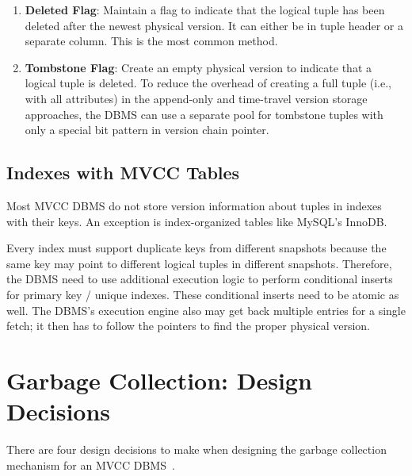 \documentclass[11pt]{article}
\begin{document}
\begin{enumerate}
    \item \textbf{Deleted Flag}:
    Maintain a flag to indicate that the logical tuple has been 
    deleted after the newest physical version. It can either be in tuple header or a separate 
    column. This is the most common method.

    \item \textbf{Tombstone Flag}:
    Create an empty physical version to indicate that a logical tuple is deleted. To reduce the 
    overhead of creating a full tuple (i.e., with all attributes) in the append-only and 
    time-travel version storage approaches, the DBMS can use a separate pool for tombstone tuples 
    with only a special bit pattern in version chain pointer.
\end{enumerate}

\subsection*{Indexes with MVCC Tables}
Most MVCC DBMS do not store version information about tuples in indexes with their keys. An 
exception is index-organized tables like MySQL's InnoDB.

Every index must support duplicate keys from different snapshots because the same key may point to 
different logical tuples in different snapshots. Therefore, the DBMS need to use additional 
execution logic to perform conditional inserts for primary key / unique indexes. These conditional 
inserts need to be atomic as well. The DBMS's execution engine also may get back multiple entries 
for a single fetch; it then has to follow the pointers to find the proper physical version.

\section{Garbage Collection: Design Decisions}
There are four design decisions to make when designing the garbage 
collection mechanism for an MVCC DBMS~\cite{jlee2016sap,bottcher19}.

\end{document}
